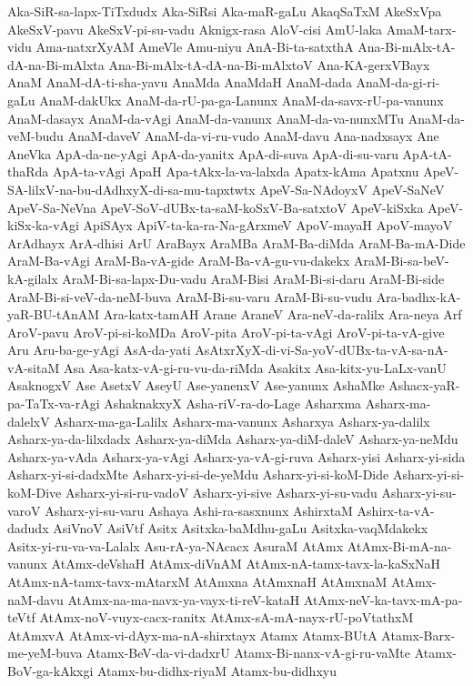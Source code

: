 {Aka-SiR-sa-lapx-TiTxdudx
Aka-SiRsi
Aka-maR-gaLu
AkaqSaTxM
AkeSxVpa
AkeSxV-pavu
AkeSxV-pi-su-vadu
Aknigx-rasa
AloV-cisi
AmU-laka
AmaM-tarx-vidu
Ama-natxrXyAM
AmeVle
Amu-niyu
AnA-Bi-ta-satxthA
Ana-Bi-mAlx-tA-dA-na-Bi-mAlxta
Ana-Bi-mAlx-tA-dA-na-Bi-mAlxtoV
Ana-KA-gerxVBayx
AnaM
AnaM-dA-ti-sha-yavu
AnaMda
AnaMdaH
AnaM-dada
AnaM-da-gi-ri-gaLu
AnaM-dakUkx
AnaM-da-rU-pa-ga-Lanunx
AnaM-da-savx-rU-pa-vanunx
AnaM-dasayx
AnaM-da-vAgi
AnaM-da-vanunx
AnaM-da-va-nunxMTu
AnaM-da-veM-budu
AnaM-daveV
AnaM-da-vi-ru-vudo
AnaM-davu
Ana-nadxsayx
Ane
AneVka
ApA-da-ne-yAgi
ApA-da-yanitx
ApA-di-suva
ApA-di-su-varu
ApA-tA-thaRda
ApA-ta-vAgi
ApaH
Apa-tAkx-la-va-lalxda
Apatx-kAma
Apatxnu
ApeV-SA-lilxV-na-bu-dAdhxyX-di-sa-mu-tapxtwtx
ApeV-Sa-NAdoyxV
ApeV-SaNeV
ApeV-Sa-NeVna
ApeV-SoV-dUBx-ta-saM-koSxV-Ba-satxtoV
ApeV-kiSxka
ApeV-kiSx-ka-vAgi
ApiSAyx
ApiV-ta-ka-ra-Na-gArxmeV
ApoV-mayaH
ApoV-mayoV
ArAdhayx
ArA-dhisi
ArU
AraBayx
AraMBa
AraM-Ba-diMda
AraM-Ba-mA-Dide
AraM-Ba-vAgi
AraM-Ba-vA-gide
AraM-Ba-vA-gu-vu-dakekx
AraM-Bi-sa-beV-kA-gilalx
AraM-Bi-sa-lapx-Du-vadu
AraM-Bisi
AraM-Bi-si-daru
AraM-Bi-side
AraM-Bi-si-veV-da-neM-buva
AraM-Bi-su-varu
AraM-Bi-su-vudu
Ara-badhx-kA-yaR-BU-tAnAM
Ara-katx-tamAH
Arane
AraneV
Ara-neV-da-ralilx
Ara-neya
Arf
AroV-pavu
AroV-pi-si-koMDa
AroV-pita
AroV-pi-ta-vAgi
AroV-pi-ta-vA-give
Aru
Aru-ba-ge-yAgi
AsA-da-yati
AsAtxrXyX-di-vi-Sa-yoV-dUBx-ta-vA-sa-nA-vA-sitaM
Asa
Asa-katx-vA-gi-ru-vu-da-riMda
Asakitx
Asa-kitx-yu-LaLx-vanU
AsaknogxV
Ase
AsetxV
AseyU
Ase-yanenxV
Ase-yanunx
AshaMke
Ashacx-yaR-pa-TaTx-va-rAgi
AshaknakxyX
Asha-riV-ra-do-Lage
Asharxma
Asharx-ma-dalelxV
Asharx-ma-ga-Lalilx
Asharx-ma-vanunx
Asharxya
Asharx-ya-dalilx
Asharx-ya-da-lilxdadx
Asharx-ya-diMda
Asharx-ya-diM-daleV
Asharx-ya-neMdu
Asharx-ya-vAda
Asharx-ya-vAgi
Asharx-ya-vA-gi-ruva
Asharx-yisi
Asharx-yi-sida
Asharx-yi-si-dadxMte
Asharx-yi-si-de-yeMdu
Asharx-yi-si-koM-Dide
Asharx-yi-si-koM-Dive
Asharx-yi-si-ru-vadoV
Asharx-yi-sive
Asharx-yi-su-vadu
Asharx-yi-su-varoV
Asharx-yi-su-varu
Ashaya
Ashi-ra-sasxnunx
AshirxtaM
Ashirx-ta-vA-dadudx
AsiVnoV
AsiVtf
Asitx
Asitxka-baMdhu-gaLu
Asitxka-vaqMdakekx
Asitx-yi-ru-va-va-Lalalx
Asu-rA-ya-NAcacx
AsuraM
AtAmx
AtAmx-Bi-mA-na-vanunx
AtAmx-deVshaH
AtAmx-diVnAM
AtAmx-nA-tamx-tavx-la-kaSxNaH
AtAmx-nA-tamx-tavx-mAtarxM
AtAmxna
AtAmxnaH
AtAmxnaM
AtAmx-naM-davu
AtAmx-na-ma-navx-ya-vayx-ti-reV-kataH
AtAmx-neV-ka-tavx-mA-pa-teVtf
AtAmx-noV-vuyx-cacx-ranitx
AtAmx-sA-mA-nayx-rU-poVtathxM
AtAmxvA
AtAmx-vi-dAyx-ma-nA-shirxtayx
Atamx
Atamx-BUtA
Atamx-Barx-me-yeM-buva
Atamx-BeV-da-vi-dadxrU
Atamx-Bi-nanx-vA-gi-ru-vaMte
Atamx-BoV-ga-kAkxgi
Atamx-bu-didhx-riyaM
Atamx-bu-didhxyu
}
